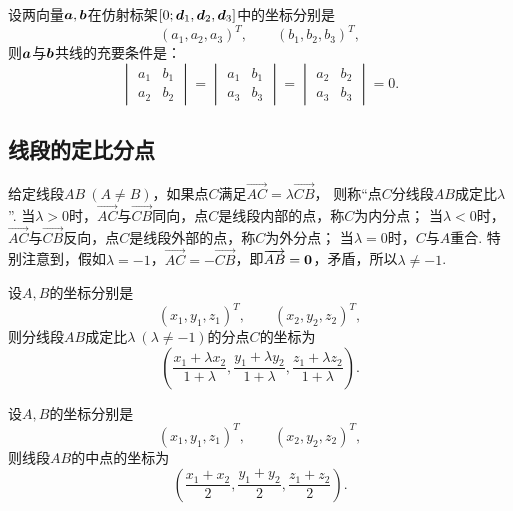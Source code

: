 \begin{theorem}\label{theorem:解析几何.两向量共线的充要条件2}
设两向量\(\boldsymbol{a},\boldsymbol{b}\)在仿射标架\([0;\boldsymbol{d}_1,\boldsymbol{d}_2,\boldsymbol{d}_3]\)中的坐标分别是\[
	(a_1,a_2,a_3)^T, \qquad
	(b_1,b_2,b_3)^T,
\]
则\(\boldsymbol{a}\)与\(\boldsymbol{b}\)共线的充要条件是：\[
\begin{vmatrix}
	a_1 & b_1 \\
	a_2 & b_2
\end{vmatrix}
= \begin{vmatrix}
	a_1 & b_1 \\
	a_3 & b_3
\end{vmatrix}
= \begin{vmatrix}
	a_2 & b_2 \\
	a_3 & b_3
\end{vmatrix} = 0.
\]
\end{theorem}

\subsection{线段的定比分点}
给定线段\(AB\ (A \neq B)\)，如果点\(C\)满足\(\vec{AC} = \lambda \vec{CB}\)，
则称“点\(C\)分线段\(AB\)成定比\(\lambda\)”.
当\(\lambda>0\)时，\(\vec{AC}\)与\(\vec{CB}\)同向，点\(C\)是线段内部的点，称\(C\)为内分点；
当\(\lambda<0\)时，\(\vec{AC}\)与\(\vec{CB}\)反向，点\(C\)是线段外部的点，称\(C\)为外分点；
当\(\lambda=0\)时，\(C\)与\(A\)重合.
特别注意到，假如\(\lambda=-1\)，\(\vec{AC}=-\vec{CB}\)，即\(\overrightarrow{AB}=\boldsymbol{0}\)，矛盾，所以\(\lambda\neq-1\).

\begin{theorem}\label{theorem:解析几何.空间两点的定比分点公式}
设\(A,B\)的坐标分别是\[
	(x_1,y_1,z_1)^T, \qquad
	(x_2,y_2,z_2)^T,
\]
则分线段\(AB\)成定比\(\lambda\ (\lambda\neq-1)\)的分点\(C\)的坐标为
\begin{equation}
	\left(
		\frac{x_1 + \lambda x_2}{1+\lambda},
		\frac{y_1 + \lambda y_2}{1+\lambda},
		\frac{z_1 + \lambda z_2}{1+\lambda}
	\right).
\end{equation}
\end{theorem}

\begin{corollary}
设\(A,B\)的坐标分别是\[
	(x_1,y_1,z_1)^T, \qquad
	(x_2,y_2,z_2)^T,
\]
则线段\(AB\)的中点的坐标为
\begin{equation}
	\left(
		\frac{x_1 + x_2}{2},
		\frac{y_1 + y_2}{2},
		\frac{z_1 + z_2}{2}
	\right).
\end{equation}
\end{corollary}

